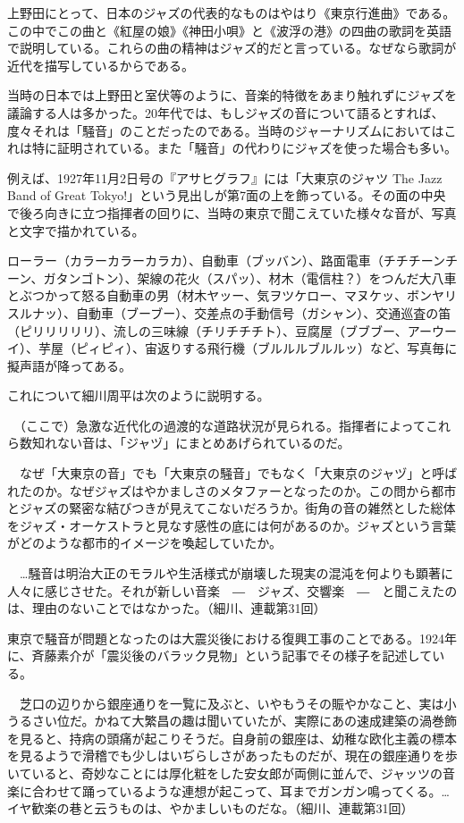 上野田にとって、日本のジャズの代表的なものはやはり《東京行進曲》である。この中でこの曲と《紅屋の娘》《神田小唄》と《波浮の港》の四曲の歌詞を英語で説明している。これらの曲の精神はジャズ的だと言っている。なぜなら歌詞が近代を描写しているからである。

当時の日本では上野田と室伏等のように、音楽的特徴をあまり触れずにジャズを議論する人は多かった。20年代では、もしジャズの音について語るとすれば、度々それは「騒音」のことだったのである。当時のジャーナリズムにおいてはこれは特に証明されている。また「騒音」の代わりにジャズを使った場合も多い。

例えば、1927年11月2日号の『アサヒグラフ』には「大東京のジャツ The Jazz Band of Great Tokyo!」という見出しが第7面の上を飾っている。その面の中央で後ろ向きに立つ指揮者の回りに、当時の東京で聞こえていた様々な音が、写真と文字で描かれている。

ローラー（カラーカラーカラカ）、自動車（ブッバン）、路面電車（チチチーンチーン、ガタンゴトン）、架線の花火（スパッ）、材木（電信柱？）をつんだ大八車とぶつかって怒る自動車の男（材木ヤッー、気ヲツケロー、マヌケッ、ボンヤリスルナッ）、自動車（ブーブー）、交差点の手動信号（ガシャン）、交通巡査の笛（ピリリリリリ）、流しの三味線（チリチチチト）、豆腐屋（ブブブー、アーウーイ）、芋屋（ピィピィ）、宙返りする飛行機（ブルルルブルルッ）など、写真毎に擬声語が降ってある。

これについて細川周平は次のように説明する。

\begin{gquote}
　（ここで）急激な近代化の過渡的な道路状況が見られる。指揮者によってこれら数知れない音は、「ジャヅ」にまとめあげられているのだ。\par{}　なぜ「大東京の音」でも「大東京の騒音」でもなく「大東京のジャヅ」と呼ばれたのか。なぜジャズはやかましさのメタファーとなったのか。この問から都市とジャズの緊密な結びつきが見えてこないだろうか。街角の音の雑然とした総体をジャズ・オーケストラと見なす感性の底には何があるのか。ジャズという言葉がどのような都市的イメージを喚起していたか。\par{}　…騒音は明治大正のモラルや生活様式が崩壊した現実の混沌を何よりも顕著に人々に感じさせた。それが新しい音楽　―　ジャズ、交響楽　―　と聞こえたのは、理由のないことではなかった。（細川、連載第31回）
\end{gquote}

東京で騒音が問題となったのは大震災後における復興工事のことである。1924年に、斉藤素介が「震災後のバラック見物」という記事でその様子を記述している。

\begin{gquote}
　芝口の辺りから銀座通りを一覧に及ぶと、いやもうその賑やかなこと、実は小うるさい位だ。かねて大繁昌の趣は聞いていたが、実際にあの速成建築の渦巻飾を見ると、持病の頭痛が起こりそうだ。自身前の銀座は、幼稚な欧化主義の標本を見るようで滑稽でも少しはいぢらしさがあったものだが、現在の銀座通りを歩いていると、奇妙なことには厚化粧をした安女郎が両側に並んで、ジャッツの音楽に合わせて踊っているような連想が起こって、耳までガンガン鳴ってくる。…イヤ歓楽の巷と云うものは、やかましいものだな。（細川、連載第31回）
\end{gquote}

